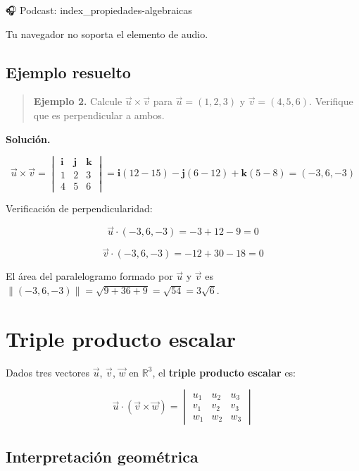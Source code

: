 \documentclass[
]{book}
\begin{document}
🎧 Podcast: index\_propiedades-algebraicas

Tu navegador no soporta el elemento de audio.

\subsection{Ejemplo resuelto}\label{ejemplo-resuelto-1}

\begin{quote}
\textbf{Ejemplo 2.} Calcule \(\vec{u} \times \vec{v}\) para \(\vec{u} = (1, 2, 3)\) y \(\vec{v} = (4, 5, 6)\). Verifique que es perpendicular a ambos.
\end{quote}

\textbf{Solución.}

\[
\vec{u} \times \vec{v} = \begin{vmatrix}
\mathbf{i} & \mathbf{j} & \mathbf{k} \\
1 & 2 & 3 \\
4 & 5 & 6
\end{vmatrix} = \mathbf{i}(12 - 15) - \mathbf{j}(6 - 12) + \mathbf{k}(5 - 8) = (-3, 6, -3)
\]

Verificación de perpendicularidad:

\[
\vec{u} \cdot (-3, 6, -3) = -3 + 12 - 9 = 0
\]

\[
\vec{v} \cdot (-3, 6, -3) = -12 + 30 - 18 = 0
\]

El área del paralelogramo formado por \(\vec{u}\) y \(\vec{v}\) es \(\|(-3, 6, -3)\| = \sqrt{9 + 36 + 9} = \sqrt{54} = 3\sqrt{6}\).

\section{Triple producto escalar}\label{triple-producto-escalar}

Dados tres vectores \(\vec{u}\), \(\vec{v}\), \(\vec{w}\) en \(\mathbb{R}^3\), el \textbf{triple producto escalar} es:

\[
\vec{u} \cdot (\vec{v} \times \vec{w}) = \begin{vmatrix}
u_1 & u_2 & u_3 \\
v_1 & v_2 & v_3 \\
w_1 & w_2 & w_3
\end{vmatrix}
\]

\subsection{Interpretación geométrica}\label{interpretaciuxf3n-geomuxe9trica}
\end{document}
